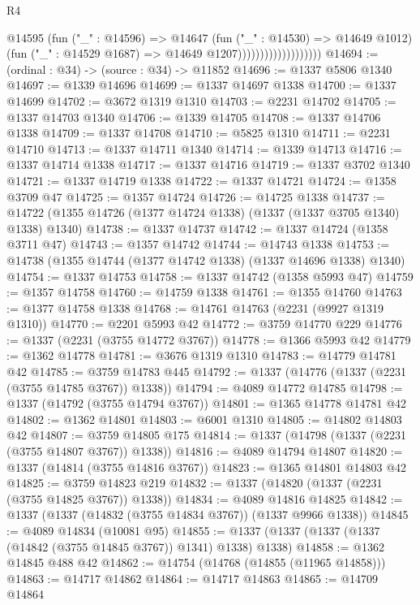 \begin{lexlean}{R4}
\begin{coremodule}
                                    @14595
                                      (fun ("_" : @14596) =>
                                      @14647
                                        (fun ("_" : @14530) => @14649 @1012)
                                        (fun ("_" : @14529 @1687) => @14649 @1207)))))))))))))))))))
@14694 := (ordinal : @34) -> (source : @34) -> @11852
@14696 := @1337 @5806 @1340
@14697 := @1339 @14696
@14699 := @1337 @14697 @1338
@14700 := @1337 @14699
@14702 := @3672 @1319 @1310
@14703 := @2231 @14702
@14705 := @1337 @14703 @1340
@14706 := @1339 @14705
@14708 := @1337 @14706 @1338
@14709 := @1337 @14708
@14710 := @5825 @1310
@14711 := @2231 @14710
@14713 := @1337 @14711 @1340
@14714 := @1339 @14713
@14716 := @1337 @14714 @1338
@14717 := @1337 @14716
@14719 := @1337 @3702 @1340
@14721 := @1337 @14719 @1338
@14722 := @1337 @14721
@14724 := @1358 @3709 @47
@14725 := @1357 @14724
@14726 := @14725 @1338
@14737 := @14722 (@1355 @14726 (@1377 @14724 @1338) (@1337 (@1337 @3705 @1340) @1338) @1340)
@14738 := @1337 @14737
@14742 := @1337 @14724 (@1358 @3711 @47)
@14743 := @1357 @14742
@14744 := @14743 @1338
@14753 := @14738 (@1355 @14744 (@1377 @14742 @1338) (@1337 @14696 @1338) @1340)
@14754 := @1337 @14753
@14758 := @1337 @14742 (@1358 @5993 @47)
@14759 := @1357 @14758
@14760 := @14759 @1338
@14761 := @1355 @14760
@14763 := @1377 @14758 @1338
@14768 := @14761 @14763 (@2231 (@9927 @1319 @1310))
@14770 := @2201 @5993 @42
@14772 := @3759 @14770 @229
@14776 := @1337 (@2231 (@3755 @14772 @3767))
@14778 := @1366 @5993 @42
@14779 := @1362 @14778
@14781 := @3676 @1319 @1310
@14783 := @14779 @14781 @42
@14785 := @3759 @14783 @445
@14792 := @1337 (@14776 (@1337 (@2231 (@3755 @14785 @3767)) @1338))
@14794 := @4089 @14772 @14785
@14798 := @1337 (@14792 (@3755 @14794 @3767))
@14801 := @1365 @14778 @14781 @42
@14802 := @1362 @14801
@14803 := @6001 @1310
@14805 := @14802 @14803 @42
@14807 := @3759 @14805 @175
@14814 := @1337 (@14798 (@1337 (@2231 (@3755 @14807 @3767)) @1338))
@14816 := @4089 @14794 @14807
@14820 := @1337 (@14814 (@3755 @14816 @3767))
@14823 := @1365 @14801 @14803 @42
@14825 := @3759 @14823 @219
@14832 := @1337 (@14820 (@1337 (@2231 (@3755 @14825 @3767)) @1338))
@14834 := @4089 @14816 @14825
@14842 := @1337 (@1337 (@14832 (@3755 @14834 @3767)) (@1337 @9966 @1338))
@14845 := @4089 @14834 (@10081 @95)
@14855 := @1337 (@1337 (@1337 (@1337 (@14842 (@3755 @14845 @3767)) @1341) @1338) @1338)
@14858 := @1362 @14845 @488 @42
@14862 := @14754 (@14768 (@14855 (@11965 @14858)))
@14863 := @14717 @14862
@14864 := @14717 @14863
@14865 := @14709 @14864

\end{coremodule}
\end{lexlean}

